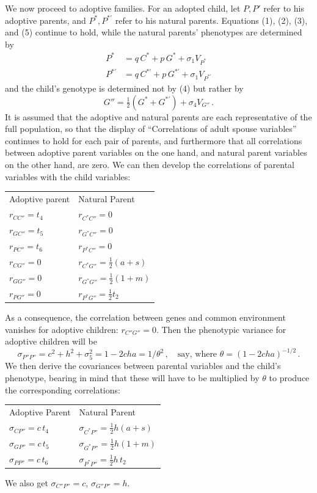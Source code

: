 ﻿\documentclass[12pt]{article}
\begin{document}
We now proceed to adoptive families. For an adopted child, let $P, P'$ refer to his adoptive parents, and $P^*, P^{*\prime}$ refer to his natural parents. Equations (1), (2), (3), and (5) continue to hold, while the natural parents' phenotypes are determined by
\begin{align}
P^* &= q\,C^* + p\,G^* + \sigma_1 V_{P^*} \tag{1*} \\
P^{*\prime} &= q\,C^{*\prime} + p\,G^{*\prime} + \sigma_1 V_{P^{*\prime}} \tag{2*}
\end{align}
and the child's genotype is determined not by (4) but rather by
\begin{equation}
G'' = \tfrac12(G^*+G^{*\prime}) + \sigma_4 V_{G''} \, . \tag{4*}
\end{equation}
It is assumed that the adoptive and natural parents are each representative of the full population, so that the display of ``Correlations of adult spouse variables'' continues to hold for each pair of parents, and furthermore that all correlations between adoptive parent variables on the one hand, and natural parent variables on the other hand, are zero. We can then develop the correlations of parental variables with the child variables:
\begin{center}
\begin{tabular}{l l}
Adoptive parent & Natural Parent \\
$r_{CC''}=t_4$ & $r_{C^*C''}=0$ \\
$r_{GC''}=t_5$ & $r_{G^*C''}=0$ \\
$r_{PC''}=t_6$ & $r_{P^*C''}=0$ \\
$r_{CG''}=0$ & $r_{C^*G''}=\tfrac12(a+s)$ \\
$r_{GG''}=0$ & $r_{G^*G''}=\tfrac12(1+m)$ \\
$r_{PG''}=0$ & $r_{P^*G''}=\tfrac12 t_2$ \\
\end{tabular}
\end{center}
As a consequence, the correlation between genes and common environment vanishes for adoptive children: $r_{C''G''}=0$. Then the phenotypic variance for adoptive children will be
\begin{equation*}
\sigma_{P''P''} = c^2+h^2+\sigma_5^2 = 1-2cha = 1/\theta^2 \, , \quad \text{say, where } \theta = (1-2cha)^{-1/2} \, .
\end{equation*}
We then derive the covariances between parental variables and the child's phenotype, bearing in mind that these will have to be multiplied by $\theta$ to produce the corresponding correlations:
\begin{center}
\begin{tabular}{l l}
Adoptive Parent & Natural Parent \\
$\sigma_{CP''}=c\,t_4$ & $\sigma_{C^*P''}=\tfrac12 h(a+s)$ \\
$\sigma_{GP''}=c\,t_5$ & $\sigma_{G^*P''}=\tfrac12 h(1+m)$ \\
$\sigma_{PP''}=c\,t_6$ & $\sigma_{P^*P''}=\tfrac12 h\,t_2$ \\
\end{tabular}
\end{center}
We also get $\sigma_{C''P''}=c$, $\sigma_{G''P''}=h$.
\end{document}

